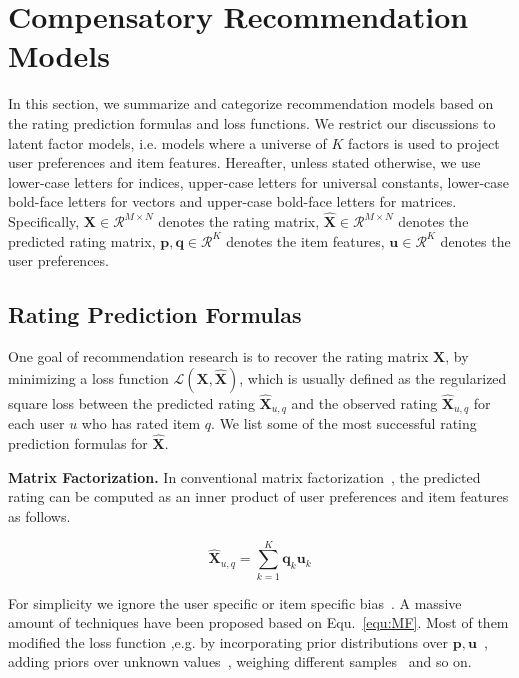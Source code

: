 \documentclass[letterpaper]{article} %
\newcommand{\Real}{\mathcal{R}}
\newcommand{\Rating}{\mathbf{X}}
\newcommand{\Loss}{\mathcal{L}}
\begin{document}
\section{Compensatory Recommendation Models}\label{sec:previousmodel}
In this section, we summarize and categorize recommendation models based on the rating prediction formulas and loss functions. We restrict our discussions to latent factor models, i.e. models where a universe of $K$ factors is used to project  user preferences and item features. Hereafter, unless stated otherwise, we use lower-case letters for indices, upper-case letters for universal constants, lower-case bold-face letters for vectors and upper-case bold-face letters for matrices. Specifically, $\mathbf{X}\in \Real^{M\times N}$ denotes the rating matrix, $\hat{\mathbf{X}}\in \Real^{M\times N}$ denotes the predicted rating matrix,  $\mathbf{p},\mathbf{q}\in \Real^K$ denotes the item features, $\mathbf{u}\in \Real^K$ denotes the user preferences.  

\subsection{Rating Prediction Formulas}
One goal of recommendation research is to recover the rating matrix $\Rating$, by minimizing a loss function $\Loss(\Rating,\hat{\Rating})$, which is usually defined as the regularized square loss between the predicted rating $\hat{\Rating}_{u,q}$ and the observed rating $\hat{\Rating}_{u,q}$ for each user $u$ who has rated item $q$. We list some of the most successful rating prediction formulas for $\hat{\Rating}$.

\textbf{Matrix Factorization.} In conventional matrix factorization~\cite{Koren2009Matrix}, the predicted rating can be computed as an inner product of user preferences and item features as follows.

\begin{equation}\label{equ:MF}
 \hat{\mathbf{X}}_{u,q}=\sum_{k=1}^{K} \mathbf{q}_k \mathbf{u}_k
\end{equation}

For simplicity we ignore the user specific or item specific bias~\cite{Koren2009Matrix}. A massive amount of techniques have been proposed based on Equ.~\ref{equ:MF}. Most of them modified the loss function ,e.g. by incorporating prior distributions over $\mathbf{p},\mathbf{u}$~\cite{salakhutdinov2008probabilistic}, adding priors over unknown values~\cite{Devooght2015Dynamic}, weighing different samples~\cite{Pil'aszy2010Fast} and so on.  
\end{document}
